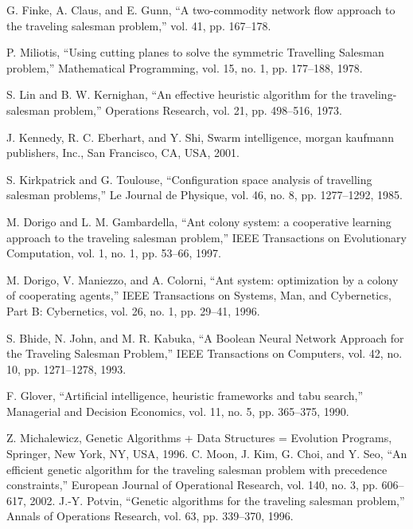 \documentclass[11pt]{article}
\begin{document}
\newpage

\begin{thebibliography}{10}


G. Finke, A. Claus, and E. Gunn, “A two-commodity network
flow approach to the traveling salesman problem,” vol. 41, pp.
167–178.

P. Miliotis, “Using cutting planes to solve the symmetric
Travelling Salesman problem,” Mathematical Programming, vol.
15, no. 1, pp. 177–188, 1978.

S. Lin and B. W. Kernighan, “An effective heuristic algorithm
for the traveling-salesman problem,” Operations Research, vol.
21, pp. 498–516, 1973.

 J. Kennedy, R. C. Eberhart, and Y. Shi, Swarm intelligence,
morgan kaufmann publishers, Inc., San Francisco, CA, USA,
2001.

S. Kirkpatrick and G. Toulouse, “Configuration space analysis of
travelling salesman problems,” Le Journal de Physique, vol. 46,
no. 8, pp. 1277–1292, 1985.

 M. Dorigo and L. M. Gambardella, “Ant colony system: a cooperative learning approach to the traveling salesman problem,”
IEEE Transactions on Evolutionary Computation, vol. 1, no. 1, pp.
53–66, 1997.

 M. Dorigo, V. Maniezzo, and A. Colorni, “Ant system: optimization by a colony of cooperating agents,” IEEE Transactions on
Systems, Man, and Cybernetics, Part B: Cybernetics, vol. 26, no.
1, pp. 29–41, 1996.

 S. Bhide, N. John, and M. R. Kabuka, “A Boolean Neural
Network Approach for the Traveling Salesman Problem,” IEEE
Transactions on Computers, vol. 42, no. 10, pp. 1271–1278, 1993.

F. Glover, “Artificial intelligence, heuristic frameworks and tabu
search,” Managerial and Decision Economics, vol. 11, no. 5, pp.
365–375, 1990.

Z. Michalewicz, Genetic Algorithms + Data Structures = Evolution Programs, Springer, New York, NY, USA, 1996.
C. Moon, J. Kim, G. Choi, and Y. Seo, “An efficient genetic
algorithm for the traveling salesman problem with precedence
constraints,” European Journal of Operational Research, vol. 140,
no. 3, pp. 606–617, 2002.
 J.-Y. Potvin, “Genetic algorithms for the traveling salesman
problem,” Annals of Operations Research, vol. 63, pp. 339–370,
1996.


\end{thebibliography}
\end{document}
